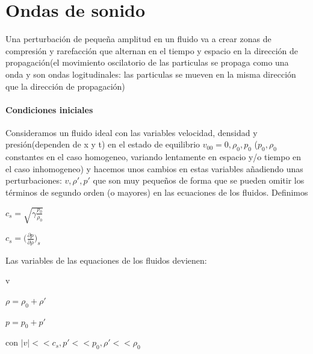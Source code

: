 \documentclass{article}
\begin{document}
\section{Ondas de sonido}
Una perturbación de pequeña amplitud en un fluido va a crear zonas de compresión y rarefacción que alternan en el tiempo y espacio en la dirección de propagación(el movimiento oscilatorio de las particulas se propaga como una onda y son ondas logitudinales:  las particulas se mueven en la misma dirección que la dirección de propagación)

\paragraph{Condiciones iniciales}
Consideramos un fluido ideal con las variables velocidad, densidad y presión(dependen de x y t) en el estado de equilibrio 
$v_{00} = 0, \rho_0 , p_0$ ($p_0, \rho_0$ constantes en el caso homogeneo, variando lentamente en espacio y/o tiempo en el caso inhomogeneo)
 y hacemos unos cambios en estas variables añadiendo unas perturbaciones:
$ v, \rho\prime, p\prime $ 
que  son muy pequeños de forma que se pueden omitir los términos de segundo orden (o mayores) en las ecuaciones de los fluidos.
Definimos 
\begin{description}  
 \item $c_s = \sqrt{\gamma \frac{p_0}{\rho_0}}$

 \item $c_s  =\big( \frac{\partial p}{\partial \rho}\big)_s  $

\end{description}  

Las variables de las equaciones de los fluidos devienen:

\begin{description}  
\item v
\item $\rho = \rho_0 + \rho\prime$
\item $p = p_0 + p\prime$

 
\end{description}  

con $|v|<<c_s, p\prime<<p_0 , \rho\prime << \rho_0$ 
\end{document}
